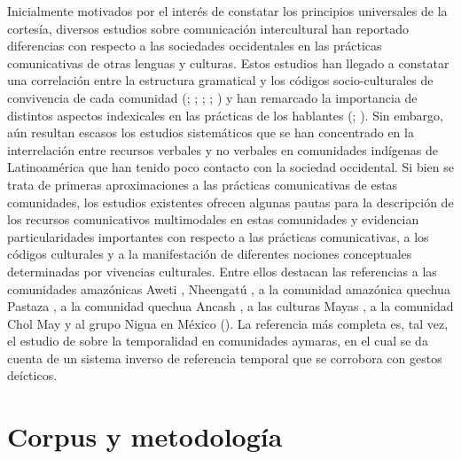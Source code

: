 \documentclass[output=paper]{../langscibook}
\begin{document}
{Inicialmente motivados por e}l interés de constatar los principios {universales de la cortesía, diversos estudios sobre comunicación intercultural han reportado diferencias con respecto a las sociedades occidentales en las prácticas comunicativas de otras lenguas y culturas. Estos estudios han llegado a constatar una correlación entre la estructura gramatical y los códigos socio-culturales de convivencia de cada comunidad} {(\citealt{Sifianou1992}; \citealt{TannenKakava1992}; \citealt{Yamada1997}; \citealt{Mori1999}; \citealt{Watanabe2005})}{ y han remarcado la importancia de distintos aspectos indexicales en las prácticas de los hablantes} (\citealt{BlommaertEtAl2005}; \citealt{BucholtzHall2005}){. Sin embargo, aún resultan escasos los estudios sistemáticos que se han concentrado en la interrelación entre recursos verbales y no verbales en comunidades indígenas de Latinoamérica que han tenido poco contacto con la sociedad occidental. Si bien se trata de primeras aproximaciones a las prácticas comunicativas de estas comunidades, los estudios existentes ofrecen algunas pautas para la descripción de los recursos comunicativos multimodales en estas comunidades y evidencian particularidades importantes con respecto a las prácticas comunicativas, a los códigos culturales y a la manifestación de diferentes nociones conceptuales determinadas por vivencias culturales. Entre ellos destacan las referencias a las comunidades amazónicas 
Aweti} {\citep{Reiter2013}}{, 
Nheengatú} {\citep{Floyd2016}}{,
a la comunidad amazónica quechua Pastaza} {\citep{Nuckolls2015}}{,
a la comunidad quechua Ancash} {\citep{Shapero2014}}{, 
a las culturas Mayas} {\citep{Brown2014}}{, 
a la comunidad Chol May} \citep{Rodríguez2019}{ y 
al grupo Nigua en México} (\citealt{CalderónEtAl2019}){. La referencia más completa es, tal vez, el estudio de \citealt{NúñezSweetser2006} sobre la temporalidad en comunidades aymaras, en el cual se da cuenta de un sistema inverso de referencia temporal que se corrobora con gestos deícticos.}

\section{Corpus y metodología}\label{sec:satti:2}
\end{document}

